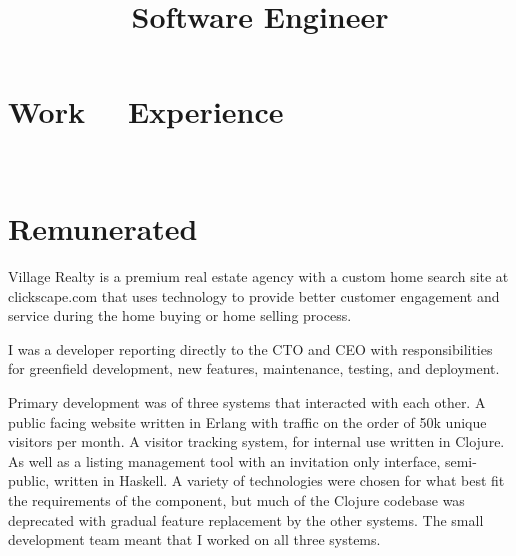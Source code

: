 \documentclass[margintitle,line]{res}
\renewcommand{\subsection}[1]{\section{\normalfont #1}}
\begin{document}
\begin{resume}
\section{Work \ \ Experience}
\ \\
\subsection{Remunerated}

\title{Software Engineer}
\begin{position}
  Village Realty is a premium real estate agency with a custom home search site
  at clickscape.com that uses technology to provide better customer engagement
  and service during the home buying or home selling process.

  I was a developer reporting directly to the CTO and CEO with responsibilities
  for greenfield development, new features, maintenance, testing, and deployment.

  Primary development was of three systems that interacted with each other.
  A public facing website  written in Erlang with traffic on the order of 50k
  unique visitors per month. A visitor tracking system, for internal use written
  in Clojure. As well as a listing management tool with an invitation only
  interface, semi-public, written in Haskell. A variety of technologies were
  chosen for what best fit the requirements of the component, but much of the
  Clojure codebase was deprecated with gradual feature replacement by the other
  systems. The small development team meant that I worked on all three systems.




\end{position}
\end{resume}
\end{document}
